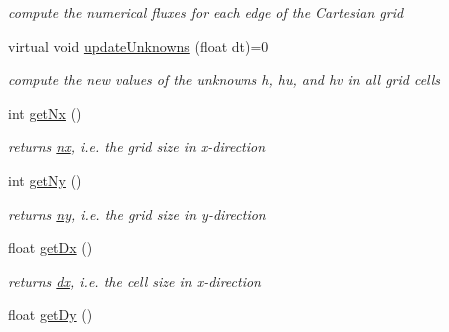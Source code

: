 \begin{DoxyCompactItemize}
\begin{DoxyCompactList}\small\item\em compute the numerical fluxes for each edge of the Cartesian grid \end{DoxyCompactList}\item 
virtual void \hyperlink{classSWE__Block_ab2b4b659f23d5d45413dece8d2da3298}{update\-Unknowns} (float dt)=0
\begin{DoxyCompactList}\small\item\em compute the new values of the unknowns h, hu, and hv in all grid cells \end{DoxyCompactList}\item 
\hypertarget{classSWE__Block_aa27028fa4bc13bb2d9251b09e0fdfce6}{int \hyperlink{classSWE__Block_aa27028fa4bc13bb2d9251b09e0fdfce6}{get\-Nx} ()}\label{classSWE__Block_aa27028fa4bc13bb2d9251b09e0fdfce6}

\begin{DoxyCompactList}\small\item\em returns \hyperlink{classSWE__Block_a46ec0dc1157997bd255fb39924f1e2bb}{nx}, i.\-e. the grid size in x-\/direction \end{DoxyCompactList}\item 
\hypertarget{classSWE__Block_a4b65557b6f73ffb6454dad3dbf86e9ad}{int \hyperlink{classSWE__Block_a4b65557b6f73ffb6454dad3dbf86e9ad}{get\-Ny} ()}\label{classSWE__Block_a4b65557b6f73ffb6454dad3dbf86e9ad}

\begin{DoxyCompactList}\small\item\em returns \hyperlink{classSWE__Block_a3f139630d12423eb4bd7df3e45c7f5da}{ny}, i.\-e. the grid size in y-\/direction \end{DoxyCompactList}\item 
\hypertarget{classSWE__Block_a2d4b3b3a932f3895c4f013cd4bb319d3}{float \hyperlink{classSWE__Block_a2d4b3b3a932f3895c4f013cd4bb319d3}{get\-Dx} ()}\label{classSWE__Block_a2d4b3b3a932f3895c4f013cd4bb319d3}

\begin{DoxyCompactList}\small\item\em returns \hyperlink{classSWE__Block_af2262b1cce6834d939c5a2315dae49b1}{dx}, i.\-e. the cell size in x-\/direction \end{DoxyCompactList}\item 
\hypertarget{classSWE__Block_add4edc5f146a02c00187a81d93f00fb7}{float \hyperlink{classSWE__Block_add4edc5f146a02c00187a81d93f00fb7}{get\-Dy} ()}\label{classSWE__Block_add4edc5f146a02c00187a81d93f00fb7}


\end{DoxyCompactItemize}
